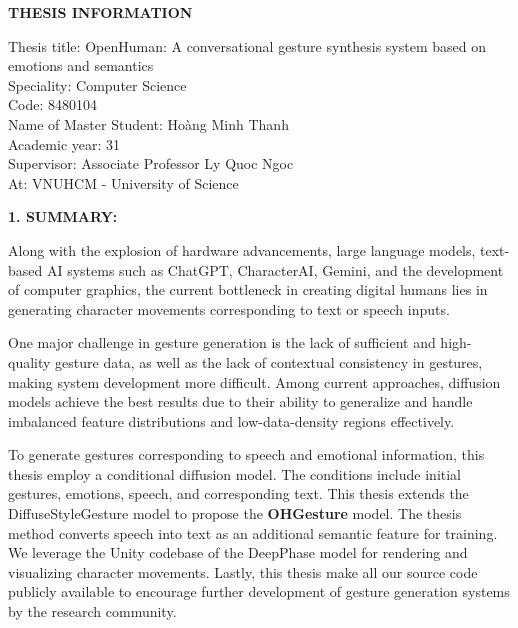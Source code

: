 
\pagebreak
{}
{}
\begin{center}
	{\centering \MakeUppercase \LARGE \fontsize{16.16}{19.26}\selectfont \bfseries THESIS INFORMATION}
\end{center}



{
	\setlength{\parindent}{0pt}
Thesis title: OpenHuman: A conversational gesture synthesis system based on emotions and semantics \\
Speciality: Computer Science \\
Code: 8480104\\
Name of Master Student: Hoàng Minh Thanh \\
Academic year: 31\\
Supervisor: Associate Professor Ly Quoc Ngoc\\
At: VNUHCM - University of Science}


\vspace{5pt}
{\MakeUppercase\Large \bfseries{1. SUMMARY:}}

Along with the explosion of hardware advancements, large language models, text-based AI systems such as ChatGPT, CharacterAI, Gemini, and the development of computer graphics, the current bottleneck in creating digital humans lies in generating character movements corresponding to text or speech inputs.

One major challenge in gesture generation is the lack of sufficient and high-quality gesture data, as well as the lack of contextual consistency in gestures, making system development more difficult. Among current approaches, diffusion models achieve the best results due to their ability to generalize and handle imbalanced feature distributions and low-data-density regions effectively.

To generate gestures corresponding to speech and emotional information, this thesis employ a conditional diffusion model. The conditions include initial gestures, emotions, speech, and corresponding text. This thesis extends the DiffuseStyleGesture model to propose the \textbf{OHGesture} model. The thesis method converts speech into text as an additional semantic feature for training. We leverage the Unity codebase of the DeepPhase model for rendering and visualizing character movements. Lastly, this thesis make all our source code publicly available to encourage further development of gesture generation systems by the research community.


